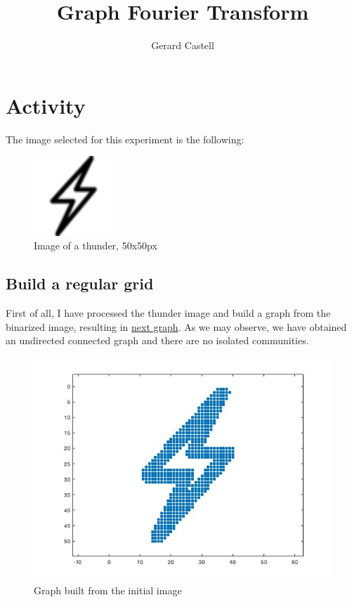 \documentclass[12pt]{article}
\title{Graph Fourier Transform}
\author{Gerard Castell}
\begin{document}
\maketitle

\thispagestyle{fancyplain}
\flushleft 


\Large
\hspace{10pt}
\small
\section{Activity}
\justifying
The image selected for this experiment is the following:
\begin{figure}[H]
	\centering
	\includegraphics[width=3cm]{thunder.png}
	\caption{Image of a thunder, 50x50px}
	\label{fig:graphRepresentation}
\end{figure}
\subsection{Build a regular grid}
\justifying
First of all, I have processed the thunder image and build a graph from the binarized image, resulting in \href{fig:3DnormLapl3clusters}{next graph}. As we may observe, we have obtained an undirected connected graph and there are no isolated communities.
\begin{figure}[H]
	\centering
	\includegraphics[width=12cm]{thunder_graph.jpg}
	\caption{Graph built from the initial image}
	\label{fig:GraphFromImage}
\end{figure}
\end{document}
